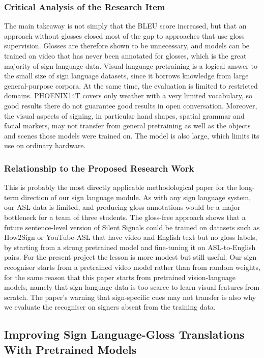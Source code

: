 \documentclass{FastFyp}
\begin{document}
\subsubsection*{Critical Analysis of the Research Item}
The main takeaway is not simply that the BLEU score increased, but that an approach without glosses closed most of the gap to approaches that use gloss supervision. Glosses are therefore shown to be unnecessary, and models can be trained on video that has never been annotated for glosses, which is the great majority of sign language data. Visual-language pretraining is a logical answer to the small size of sign language datasets, since it borrows knowledge from large general-purpose corpora. At the same time, the evaluation is limited to restricted domains. PHOENIX14T \cite{ref:Camgoz:2018} covers only weather with a very limited vocabulary, so good results there do not guarantee good results in open conversation. Moreover, the visual aspects of signing, in particular hand shapes, spatial grammar and facial markers, may not transfer from general pretraining as well as the objects and scenes those models were trained on. The model is also large, which limits its use on ordinary hardware.

\subsubsection*{Relationship to the Proposed Research Work}
This is probably the most directly applicable methodological paper for the long-term direction of our sign language module. As with any sign language system, our ASL data is limited, and producing gloss annotations would be a major bottleneck for a team of three students. The gloss-free approach shows that a future sentence-level version of Silent Signals could be trained on datasets such as How2Sign \cite{duarte2021how2sign} or YouTube-ASL \cite{ref:Uthus:2023} that have video and English text but no gloss labels, by starting from a strong pretrained model and fine-tuning it on ASL-to-English pairs. For the present project the lesson is more modest but still useful. Our sign recogniser starts from a pretrained video model rather than from random weights, for the same reason that this paper starts from pretrained vision-language models, namely that sign language data is too scarce to learn visual features from scratch. The paper's warning that sign-specific cues may not transfer is also why we evaluate the recogniser on signers absent from the training data.

\subsection{Improving Sign Language-Gloss Translations With Pretrained Models}
\end{document}

